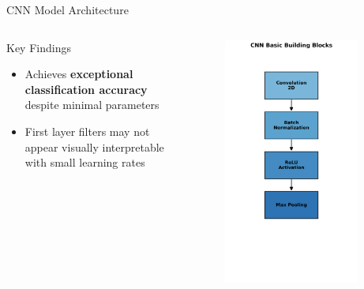 \documentclass[aspectratio=169,8pt]{beamer}  %
\begin{document}
\begin{frame}{CNN Model Architecture}
\begin{columns}[T]
\begin{column}{0.6\textwidth}
\begin{block}{Key Findings}
\begin{itemize}
\item Achieves \textbf{exceptional classification accuracy} despite minimal parameters
\item First layer filters may not appear visually interpretable with small learning rates
\end{itemize}
\end{block}
\end{column}
\begin{column}{0.4\textwidth}
\begin{figure}
\includegraphics[width=0.9\textwidth]{imgs/cnn_basic_block.png}
\end{figure}
\end{column}
\end{columns}
\end{frame}
\end{document}
